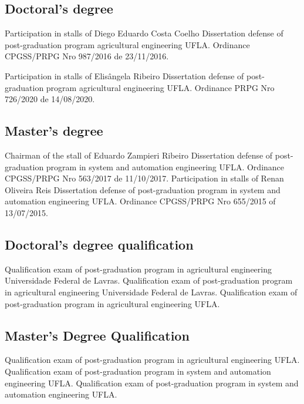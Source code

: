 \documentclass[11pt,a4paper,sans]{moderncv} %
\begin{document}
\subsection{Doctoral's degree}
			{Participation in stalls of Diego Eduardo Costa Coelho}
			{Dissertation defense of post-graduation program agricultural engineering}{}
			{UFLA. Ordinance CPGSS/PRPG Nro 987/2016 de 23/11/2016.}


			{Participation in stalls of Elisângela Ribeiro}
			{Dissertation defense of post-graduation program agricultural engineering}{}
			{UFLA. Ordinance PRPG Nro 726/2020 de 14/08/2020.}
			
\subsection{Master's degree}
			{Chairman of the stall of Eduardo Zampieri Ribeiro}
			{Dissertation defense of post-graduation program  in system and automation engineering }{}
			{UFLA. Ordinance CPGSS/PRPG Nro 563/2017 de 11/10/2017.}
			{Participation in stalls of Renan Oliveira Reis}
			{Dissertation defense of post-graduation program  in system and automation engineering }{}
			{UFLA. Ordinance CPGSS/PRPG Nro 655/2015 of 13/07/2015.}

\subsection{Doctoral's degree qualification}
			{}
			{Qualification exam of post-graduation program  in agricultural engineering}{}
			{Universidade Federal de Lavras.}
			{}
			{Qualification exam of post-graduation program  in agricultural engineering}{}
			{Universidade Federal de Lavras.}
			{}
			{Qualification exam of post-graduation program  in agricultural engineering}{}
			{UFLA. }

\subsection{Master's Degree Qualification}
			{}
			{Qualification exam of post-graduation program  in agricultural engineering}{}
			{UFLA.}
			{}
			{Qualification exam of post-graduation program  in system and automation engineering}{}
			{UFLA.}
			{}
			{Qualification exam of post-graduation program  in system and automation engineering}{}
			{UFLA. }
\end{document}
